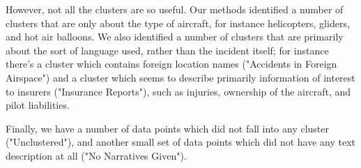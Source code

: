 \documentclass[a4paper,11pt]{article}
\begin{document}
\begin{multicols}{2}
However, not all the clusters are so useful.  Our methods identified a number of clusters that are only about the type of aircraft, for instance helicopters, gliders, and hot air balloons. We also identified a number of clusters that are primarily about the sort of language used, rather than the incident itself; for instance there's a cluster which contains foreign location names ("Accidents in Foreign Airspace") and a cluster which seems to describe primarily information of interest to insurers ("Insurance Reports"), such as injuries, ownership of the aircraft, and pilot liabilities. 

Finally, we have a number of data points which did not fall into any cluster ("Unclustered"), and another small set of data points which did not have any text description at all ("No Narratives Given"). 

\vspace{-3ex}



\end{multicols}
\end{document}

